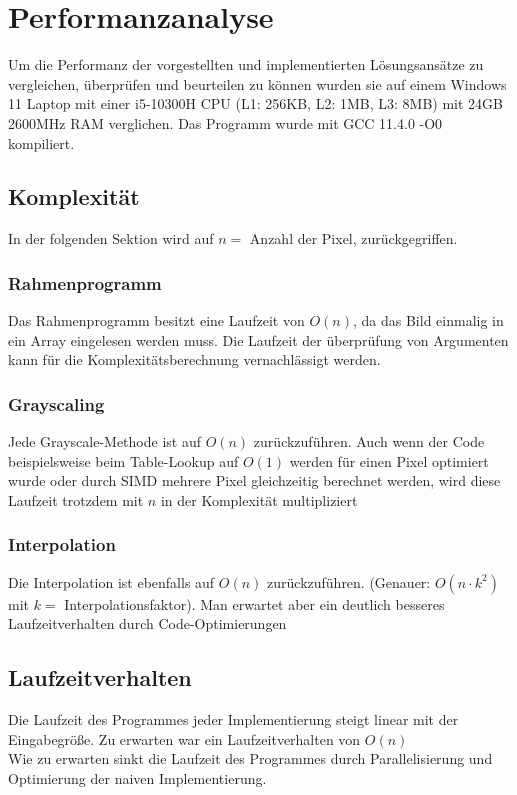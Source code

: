\documentclass[course=erap]{aspdoc}
\begin{document}
\section{Performanzanalyse}
Um die Performanz der vorgestellten und implementierten Lösungsansätze zu vergleichen, überprüfen und beurteilen zu können wurden sie auf einem Windows 11 Laptop mit einer i5-10300H CPU (L1: 256KB, L2: 1MB, L3: 8MB) mit 24GB 2600MHz RAM verglichen. Das Programm wurde mit GCC 11.4.0 -O0 kompiliert.

\subsection{Komplexität}
In der folgenden Sektion wird auf $n =$ Anzahl der Pixel, zurückgegriffen.

\subsubsection{Rahmenprogramm}
Das Rahmenprogramm besitzt eine Laufzeit von $O(n)$, da das Bild einmalig in ein Array eingelesen werden muss. Die Laufzeit der überprüfung von Argumenten kann für die Komplexitätsberechnung vernachlässigt werden.

\subsubsection{Grayscaling}
Jede Grayscale-Methode ist auf $O(n)$ zurückzuführen. Auch wenn der Code beispielsweise beim Table-Lookup auf $O(1)$ werden für einen Pixel optimiert wurde oder durch SIMD mehrere Pixel gleichzeitig berechnet werden, wird diese Laufzeit trotzdem mit $n$ in der Komplexität multipliziert

\subsubsection{Interpolation}
Die Interpolation ist ebenfalls auf $O(n)$ zurückzuführen. (Genauer: $O(n \cdot k^{2})$ mit $k =$ Interpolationsfaktor). Man erwartet aber ein deutlich besseres Laufzeitverhalten durch Code-Optimierungen

\subsection{Laufzeitverhalten}
Die Laufzeit des Programmes jeder Implementierung steigt linear mit der Eingabegröße. Zu erwarten war ein Laufzeitverhalten von $O(n)$\\
Wie zu erwarten sinkt die Laufzeit des Programmes durch Parallelisierung und Optimierung der naiven Implementierung.
\end{document}
